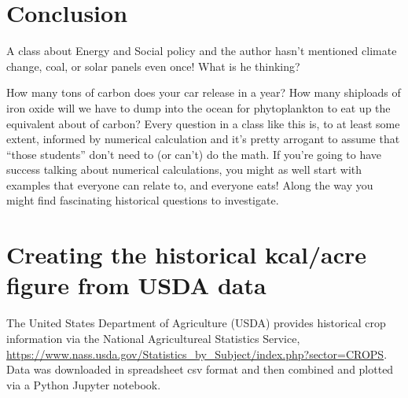 \documentclass[12pt]{iopart}
\begin{document}
\section{Conclusion}
A class about Energy and Social policy and the author hasn't mentioned climate change, coal, or solar panels even once!  What is he thinking?  

How many tons of carbon does your car release in a year? How many shiploads of iron oxide will we have to dump into the ocean for phytoplankton to eat up the equivalent about of carbon?  Every question in a class like this is, to at least some extent, informed by numerical calculation and it's pretty arrogant to assume that ``those students'' don't need to (or can't) do the math.  If you're going to have success talking about numerical calculations, you might as well start with examples that everyone can relate to, and everyone eats!  Along the way you might find fascinating historical questions to investigate.   










\clearpage
\appendix
\section{Creating the historical kcal/acre figure from USDA data}
\label{how_yield_plot_is_made}
The United States Department of Agriculture (USDA) provides historical crop information via the National Agricultureal Statistics Service, \url{https://www.nass.usda.gov/Statistics_by_Subject/index.php?sector=CROPS}.  Data was downloaded in spreadsheet csv format and then combined and plotted via a Python Jupyter notebook.   
\end{document}
